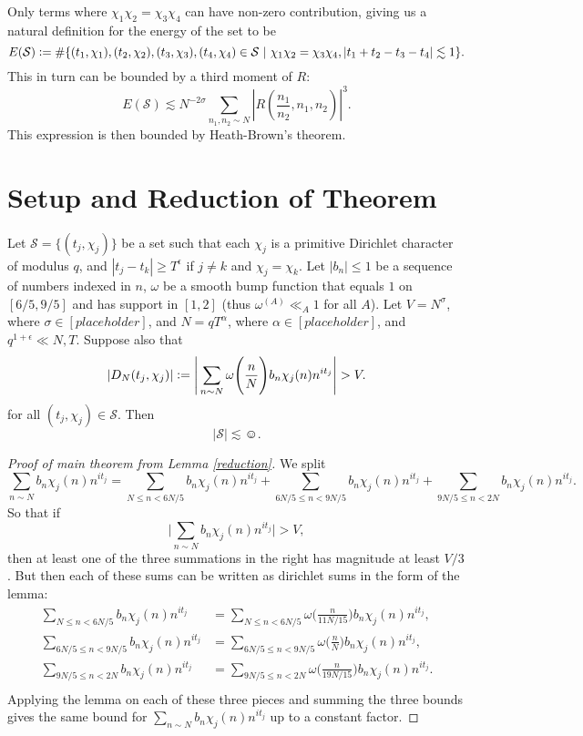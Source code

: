 Only terms where $\chi_1\chi_2=\chi_3\chi_4$ can have non-zero contribution, giving us a natural definition for the energy of the set to be \[
E(\mathcal{S})\defeq \#\{(t_1,\chi_1),(t_2,\chi_2),(t_3,\chi_3),(t_4,\chi_4)\in \mathcal{S} \ | \ \chi_1\chi_2=\chi_3\chi_4, |t_1+t_2-t_3-t_4|\lesssim 1\}.
\]
This in turn can be bounded by a third moment of $R$: \[
 E(\mathcal{S})\lesssim N^{-2\sigma}\sum_{n_1,n_2\sim N}\left|R\left(\frac{n_1}{n_2},n_1,n_2\right) \right|^3.\]
 This expression is then bounded by Heath-Brown's theorem.

\section{Setup and Reduction of Theorem}
\begin{lemma}\label{reduction}
    Let $\mathcal{S}=\{(t_j,\chi_j)\}$ be a set such that each $\chi_j$ is a primitive Dirichlet character of modulus $q$, and $|t_j-t_k|\geq T^\epsilon$ if $j\neq k$ and $\chi_j=\chi_k$. Let $|b_n|\leq 1$ be a sequence of numbers indexed in $n$, $\omega$ be a smooth bump function that equals $1$ on $[6/5,9/5]$ and has support in $[1,2]$ (thus $\omega^{(A)}\ll_A 1$ for all $A$). Let $V=N^\sigma$, where $\sigma \in [placeholder]$, and $N=qT^\alpha$, where $\alpha \in [placeholder]$, and $q^{1+\epsilon}\ll N,T$. Suppose also that \[
    |D_N(t_j,\chi_j)|\defeq\Bigg|\sum_{n\sim N} \omega\Bigg(\frac{n}{N}\Bigg)b_n\chi_j(n)n^{it_j} \Bigg|>V.
\]
for all $(t_j,\chi_j)\in\mathcal{S}$.
Then \[
|\mathcal{S}|\lesssim \smiley.
\]
\end{lemma}
\begin{proof}[Proof of main theorem from Lemma \ref{reduction}]
    We split \[
        \sum_{n\sim N} b_n\chi_j(n)n^{it_j}=\sum_{N\leq n< 6N/5} b_n\chi_j(n)n^{it_j} +\sum_{6N/5 \leq n < 9N/5} b_n\chi_j(n)n^{it_j} +\sum_{9N/5 \leq n < 2N} b_n\chi_j(n)n^{it_j}.
    \]
    So that if \[
        \Big|\sum_{n\sim N} b_n\chi_j(n)n^{it_j}\Big|>V,
    \]
    then at least one of the three summations in the right has magnitude at least $V/3$.
    But then each of these sums can be written as dirichlet sums in the form of the lemma: \begin{align*}
        \sum_{N\leq n< 6N/5} b_n\chi_j(n)n^{it_j} &=  \sum_{N\leq n< 6N/5} \omega\Bigg(\frac{n}{11N/15}\Bigg) b_n\chi_j(n)n^{it_j}, \\
        \sum_{6N/5 \leq n < 9N/5} b_n\chi_j(n)n^{it_j} &=  \sum_{6N/5 \leq n < 9N/5} \omega\Bigg(\frac{n}{N}\Bigg) b_n\chi_j(n)n^{it_j}, \\
        \sum_{9N/5 \leq n < 2N}  b_n\chi_j(n)n^{it_j} &=  \sum_{9N/5 \leq n < 2N}  \omega\Bigg(\frac{n}{19N/15}\Bigg) b_n\chi_j(n)n^{it_j}. \\
    \end{align*}
    Applying the lemma on each of these three pieces and summing the three bounds gives the same bound for $\sum_{n\sim N} b_n\chi_j(n)n^{it_j}$ up to a constant factor.
\end{proof}
